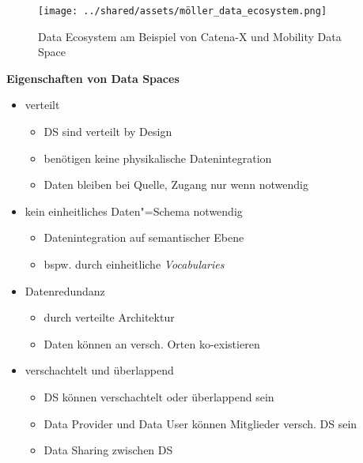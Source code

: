 \begin{figure}
    \texttt{[image: ../shared/assets/möller\_data\_ecosystem.png]}
    \caption{Data Ecosystem am Beispiel von Catena-X und Mobility Data Space~\cite{mollerIndustrialDataEcosystems2024}}
\end{figure}

\textbf{Eigenschaften von Data Spaces}
\begin{itemize}
    \item verteilt
    \begin{itemize}
        \item DS sind verteilt by Design
        \item benötigen keine physikalische Datenintegration
        \item Daten bleiben bei Quelle, Zugang nur wenn notwendig
    \end{itemize}

    \item kein einheitliches Daten"=Schema notwendig
    \begin{itemize}
        \item Datenintegration auf semantischer Ebene
        \item bspw. durch einheitliche \emph{Vocabularies}
    \end{itemize}
    
    \item Datenredundanz
    \begin{itemize}
        \item durch verteilte Architektur
        \item Daten können an versch. Orten ko-existieren
    \end{itemize}
    
    \item verschachtelt und überlappend
    \begin{itemize}
        \item DS können verschachtelt oder überlappend sein
        \item Data Provider und Data User können Mitglieder versch. DS sein
        \item Data Sharing zwischen DS~\cite{mollerIndustrialDataEcosystems2024}
    \end{itemize}
\end{itemize}

\vspace{1cm}

